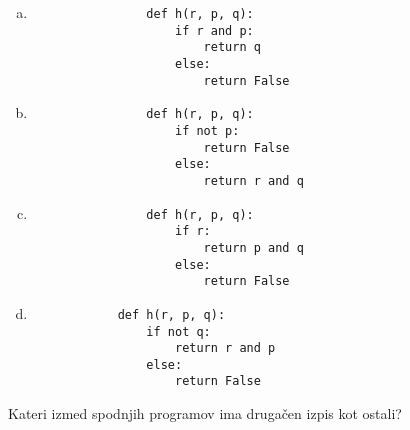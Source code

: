 \documentclass[arhiv, 10pt]{../izpit}
\begin{document}
        \begin{multicols}{2}
        \begin{enumerate}[(a)]
\item 
                \begin{verbatim}
                def h(r, p, q):
                    if r and p:
                        return q
                    else:
                        return False
                \end{verbatim}
            
\item 
                \begin{verbatim}
                def h(r, p, q):
                    if not p:
                        return False
                    else:
                        return r and q
                \end{verbatim}
            
\item 
                \begin{verbatim}
                def h(r, p, q):
                    if r:
                        return p and q
                    else:
                        return False
                \end{verbatim}
            
\item 
            \begin{verbatim}
            def h(r, p, q):
                if not q:
                    return r and p
                else:
                    return False
            \end{verbatim}
        
\end{enumerate}

        \end{multicols}
    
        \naloga*
        
        Kateri izmed spodnjih programov ima drugačen izpis kot ostali?
    
\end{document}
